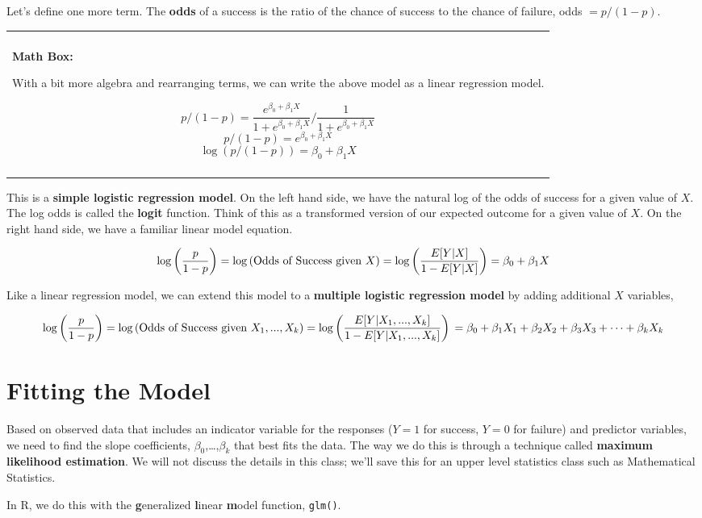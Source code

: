 \documentclass[
]{book}
\newenvironment{mathbox}
{
    \begin{center}
    
    \begin{tabular}{|p{0.8\textwidth}|}
    \rowcolor{LightYellow}
    \hline\\
    \rowcolor{LightYellow}
    \textbf{Math Box:}
}
{
    \\\rowcolor{LightYellow}
    \\\hline
    \end{tabular} 
    \end{center}
}
\begin{document}
Let's define one more term. The \textbf{odds} of a success is the ratio of the chance of success to the chance of failure, odds \(=p/(1-p)\).

\begin{mathbox}
With a bit more algebra and rearranging terms, we can write the above
model as a linear regression model.

\[p/(1-p) = \frac{e^{\beta_0 +\beta_1X}}{1 + e^{\beta_0 +\beta_1X}}/\frac{1}{1 + e^{\beta_0 +\beta_1X}}\]
\[p/(1-p) = e^{\beta_0 +\beta_1X}\]
\[\log(p/(1-p)) = \beta_0 +\beta_1X\]
\end{mathbox}

This is a \textbf{simple logistic regression model}. On the left hand side, we have the natural log of the odds of success for a given value of \(X\). The log odds is called the \textbf{logit} function. Think of this as a transformed version of our expected outcome for a given value of \(X\). On the right hand side, we have a familiar linear model equation.

\[\log\left(\frac{p}{1-p}\right) =\log\left(\hbox{Odds of Success given } X\right) = \log\left(\frac{E[Y|X]}{1-E[Y|X]}\right) = \beta_0 +\beta_1X\]

Like a linear regression model, we can extend this model to a \textbf{multiple logistic regression model} by adding additional \(X\) variables,

\[\log\left(\frac{p}{1-p}\right) =\log\left(\hbox{Odds of Success given } X_1,...,X_k\right)= \log\left(\frac{E[Y|X_1,...,X_k]}{1-E[Y|X_1,...,X_k]}\right) \\ = \beta_0 +\beta_1X_1+\beta_2X_2+\beta_3X_3+\cdots +\beta_kX_k\]

\hypertarget{fitting-the-model}{%
\section{Fitting the Model}\label{fitting-the-model}}

Based on observed data that includes an indicator variable for the responses (\(Y=1\) for success, \(Y=0\) for failure) and predictor variables, we need to find the slope coefficients, \(\beta_0\),\ldots,\(\beta_k\) that best fits the data. The way we do this is through a technique called \textbf{maximum likelihood estimation}. We will not discuss the details in this class; we'll save this for an upper level statistics class such as Mathematical Statistics.

In R, we do this with the \textbf{g}eneralized \textbf{l}inear \textbf{m}odel function, \texttt{glm()}.
\end{document}

